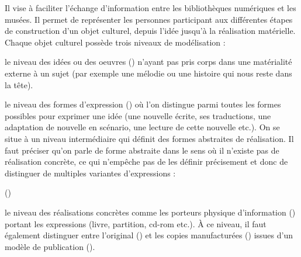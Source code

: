 Il vise à faciliter l’échange d’information entre les bibliothèques numériques et les musées. 
Il permet de représenter les personnes participant aux différentes étapes de construction d’un objet culturel, depuis l’idée jusqu’à la réalisation matérielle.
Chaque objet culturel possède trois niveaux de modélisation :
\begin{liste}
	\item le niveau des idées ou des oeuvres () n’ayant pas pris corps dans une matérialité externe à un sujet (par exemple une mélodie ou une histoire qui nous reste dans la tête). 

	\item le niveau des formes d'expression () où l'on distingue parmi toutes les formes possibles pour exprimer une idée (une nouvelle écrite, ses traductions, une adaptation de nouvelle en scénario, une lecture de cette nouvelle etc.).
	On se situe à un niveau intermédiaire qui définit des formes abstraites de  réalisation.
	Il faut préciser qu'on parle de forme abstraite dans le sens où il n'existe pas de réalisation concrète, ce qui n'empêche pas de les définir précisement et donc de distinguer de multiples variantes d'expressions :

	 (\cite{Aalberg2008})
	
	\item le niveau des réalisations concrètes comme les porteurs physique d’information () portant les expressions (livre, partition, cd-rom etc.). 
	À ce niveau, il faut également distinguer entre l’original () et les copies manufacturées () issues d’un modèle de publication (). %
\end{liste}





